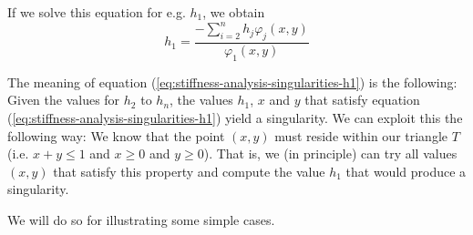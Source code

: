 \documentclass{article}
\renewcommand{\phi}{\varphi}
\begin{document}
If we solve this equation for e.g. $h_1$, we obtain
\begin{equation}
  \label{eq:stiffness-analysis-singularities-h1}
  h_1 = \frac{-\sum_{i=2}^n h_j \phi_j(x,y)}{\phi_1(x,y)}
\end{equation}

The meaning of equation (\ref{eq:stiffness-analysis-singularities-h1}) is the following: Given the values for $h_2$ to $h_n$, the values $h_1$, $x$ and $y$ that satisfy equation (\ref{eq:stiffness-analysis-singularities-h1}) yield a singularity. We can exploit this the following way: We know that the point $(x,y)$ must reside within our triangle $T$ (i.e. $x+y\leq 1$ and $x\geq 0$ and $y\geq 0$). That is, we (in principle) can try all values $(x,y)$ that satisfy this property and compute the value $h_1$ that would produce a singularity.

We will do so for illustrating some simple cases.
\end{document}
